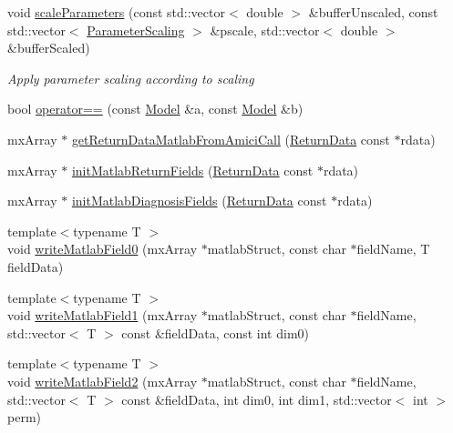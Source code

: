 \begin{DoxyCompactItemize}
void \mbox{\hyperlink{namespaceamici_a28b22fcad5ed463795858b60952587cd}{scale\+Parameters}} (const std\+::vector$<$ double $>$ \&buffer\+Unscaled, const std\+::vector$<$ \mbox{\hyperlink{namespaceamici_a42f062082226e9284c201d9eab71a3a0}{Parameter\+Scaling}} $>$ \&pscale, std\+::vector$<$ double $>$ \&buffer\+Scaled)
\begin{DoxyCompactList}\small\item\em Apply parameter scaling according to {\ttfamily scaling} \end{DoxyCompactList}\item 
bool \mbox{\hyperlink{namespaceamici_ad5a9ae5abc63d6c24c64506c0f9aed6d}{operator==}} (const \mbox{\hyperlink{classamici_1_1_model}{Model}} \&a, const \mbox{\hyperlink{classamici_1_1_model}{Model}} \&b)
\item 
mx\+Array $\ast$ \mbox{\hyperlink{namespaceamici_a698409f4b9ce06055bcebcee39f81a91}{get\+Return\+Data\+Matlab\+From\+Amici\+Call}} (\mbox{\hyperlink{classamici_1_1_return_data}{Return\+Data}} const $\ast$rdata)
\item 
mx\+Array $\ast$ \mbox{\hyperlink{namespaceamici_a7449834fca1e0bde53d5f73ae0d2b929}{init\+Matlab\+Return\+Fields}} (\mbox{\hyperlink{classamici_1_1_return_data}{Return\+Data}} const $\ast$rdata)
\item 
mx\+Array $\ast$ \mbox{\hyperlink{namespaceamici_aa12d4917fed647a1edeaaa26a261c770}{init\+Matlab\+Diagnosis\+Fields}} (\mbox{\hyperlink{classamici_1_1_return_data}{Return\+Data}} const $\ast$rdata)
\item 
{\footnotesize template$<$typename T $>$ }\\void \mbox{\hyperlink{namespaceamici_ad2949f3931c6fac6fd12fd7ede47ac30}{write\+Matlab\+Field0}} (mx\+Array $\ast$matlab\+Struct, const char $\ast$field\+Name, T field\+Data)
\item 
{\footnotesize template$<$typename T $>$ }\\void \mbox{\hyperlink{namespaceamici_a64677d9f7279591de5f36ab162fbf54b}{write\+Matlab\+Field1}} (mx\+Array $\ast$matlab\+Struct, const char $\ast$field\+Name, std\+::vector$<$ T $>$ const \&field\+Data, const int dim0)
\item 
{\footnotesize template$<$typename T $>$ }\\void \mbox{\hyperlink{namespaceamici_aab2bcdb74e3b44bb65e12b14d3ffb42b}{write\+Matlab\+Field2}} (mx\+Array $\ast$matlab\+Struct, const char $\ast$field\+Name, std\+::vector$<$ T $>$ const \&field\+Data, int dim0, int dim1, std\+::vector$<$ int $>$ perm)
\item 

\end{DoxyCompactItemize}
